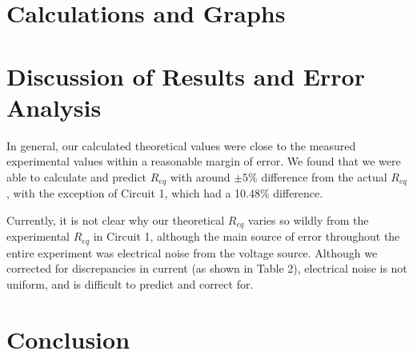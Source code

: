 \documentclass[12pt,letterpaper,titlepage]{report}
\begin{document}

\bigskip
\section*{Calculations and Graphs}

\begin{minipage}{\linewidth}
\centering
{}

\end{minipage}

\bigskip
\bigskip

\begin{minipage}{\linewidth}
\centering
{}

\end{minipage}



\bigskip
\section*{Discussion of Results and Error Analysis}

In general, our calculated theoretical values were close to the measured experimental values within a reasonable margin of error. We found that we were able to calculate and predict $R_{eq}$ with around $\pm 5\%$ difference from the actual $R_{eq}$, with the exception of Circuit 1, which had a 10.48\% difference.

\medskip

Currently, it is not clear why our theoretical $R_{eq}$ varies so wildly from the experimental $R_{eq}$ in Circuit 1, although the main source of error throughout the entire experiment was electrical noise from the voltage source. Although we corrected for discrepancies in current (as shown in Table 2), electrical noise is not uniform, and is difficult to predict and correct for.



\bigskip
\section*{Conclusion}


\end{document}
